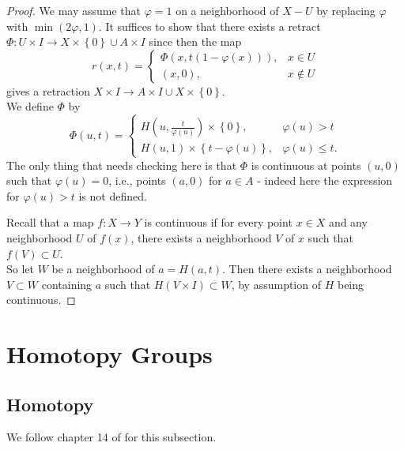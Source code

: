 \documentclass[reqno]{amsart}
\theoremstyle{definition}
\theoremstyle{remark}
\begin{document}
\begin{proof}
    We may assume that $\varphi  = 1$ on a neighborhood
    of $X - U$ by replacing $\varphi $ with
    $\min \left( 2 \varphi , 1 \right) $.
    It suffices to show that there exists a retract
    $\Phi \colon U \times I \to X \times \left\{ 0 \right\} 
    \cup A \times I$ since then the
    map
    \[
    r\left( x,t \right) 
    =
    \begin{cases}
        \Phi\left( x, t \left( 1-\varphi (x) \right)  \right),&
        x \in U\\
        (x,0),& x \not\in U
    \end{cases}
    \] 
    gives a retraction $X \times I \to A \times I \cup 
    X \times \left\{ 0 \right\} $.\\
    We define $\Phi$ by
    \[
    \Phi(u,t) = 
    \begin{cases}
        H\left( u, \frac{t}{\varphi (u)} \right) \times 
        \left\{ 0 \right\},& \varphi (u) > t\\
        H\left( u,1 \right) \times 
        \left\{ t- \varphi (u) \right\} ,& \varphi (u)\le t.
    \end{cases}
    \] 
    The only thing that needs checking here is
    that $\Phi$ is continuous at
    points $\left( u,0 \right) $ such that
    $\varphi (u) = 0$, i.e., points $(a,0)$ for 
    $a \in A$ - indeed here the expression for
    $\varphi (u) > t$ is not defined.

    Recall that a map $f \colon X \to Y$ is continuous
    if for every point $x \in X$ and any neighborhood
    $U$ of $f(x)$, there exists a neighborhood
    $V$ of $x$ such that $f(V) \subset U$.\\
    So let $W$ be a neighborhood of $a = 
    H(a,t)$. Then there exists a neighborhood
    $V \subset W$ containing $a$ such that
    $H\left( V \times I \right) \subset W$, by
    assumption of $H$ being continuous.







\end{proof}


\newpage

\section{Homotopy Groups}

\subsection{Homotopy}
We follow chapter 14 of \cite{Bredon} for this subsection.\\
\end{document}
